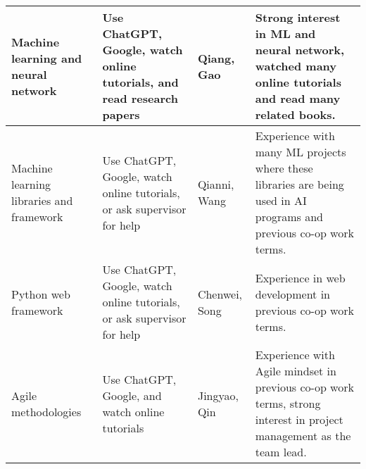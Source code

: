 \documentclass[12pt]{article}
\begin{document}
\begin{enumerate}
\begin{table}[]
\begin{tabular}{| p{3cm} | p{3.5cm} | p{2cm} | p{5cm} |}
    \hline
      \raggedright Machine learning and neural network & \raggedright Use ChatGPT, Google, watch online tutorials, and read research papers & Qiang, Gao & Strong interest in ML and neural network, watched many online tutorials and read many related books. \\
    \hline
      \raggedright Machine learning libraries and framework & \raggedright Use ChatGPT, Google, watch online tutorials, or ask supervisor for help & Qianni, Wang & Experience with many ML projects where these libraries are being used in AI programs and previous co-op work terms. \\
    \hline
      \raggedright Python web framework & \raggedright Use ChatGPT, Google, watch online tutorials, or ask supervisor for help & Chenwei, Song & Experience in web development in previous co-op work terms. \\
    \hline
      \raggedright Agile methodologies & \raggedright Use ChatGPT, Google, and watch online tutorials & Jingyao, Qin & Experience with Agile mindset in previous co-op work terms, strong interest in project management as the team lead. \\
    \hline
    \end{tabular}
\end{table}
\end{enumerate}
\end{document}
